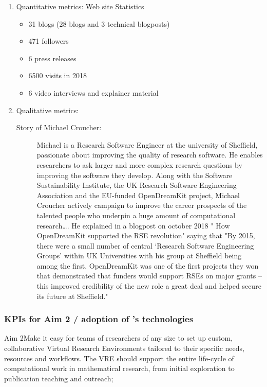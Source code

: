 \begin{enumerate}
\item Quantitative metrics: Web site Statistics
\begin{itemize}
\item 31 blogs (28 blogs and 3 technical blogposts)
\item 471 followers
\item 6 press releases
\item 6500 visits in 2018
\item 6 video interviews and explainer material
\end{itemize}

\item Qualitative metrics:
\begin{description}
\item [Story of Michael Croucher:] Michael is a Research Software Engineer at the university of Sheffield, passionate about improving the 
quality of research software. He enables researchers to ask larger and more complex research questions by improving the software they 
develop. Along with the Software Sustainability Institute, the UK Research Software Engineering Association and the EU-funded OpenDreamKit 
project, Michael Croucher actively campaign to improve the career prospects of the talented people who underpin a huge amount of 
computational research…. He explained in a blogpost on october 2018 " How OpenDreamKit supported the RSE revolution" saying that "By 2015, 
there were a small number of central ‘Research Software Engineering Groups’ within UK Universities with his group at Sheffield  being among 
the first. OpenDreamKit was one of the first projects they won that demonstrated that funders would support RSEs on major grants – this 
improved credibility of the new role a great deal and helped secure its future at Sheffield." 
\end{description}
\end{enumerate}

\subsubsection{KPIs for Aim 2 / adoption of \ODK's technologies}

\begin{recommendation}{Aim 2}Make it easy for teams of researchers of any size to set up custom, collaborative Virtual Research Environments 
tailored to their specific needs, resources and workflows. The VRE should support the entire life-cycle of computational work in 
mathematical research, from initial exploration to publication teaching and outreach;
\end{recommendation}

